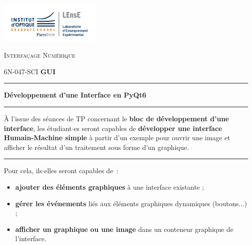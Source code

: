 \documentclass[a4paper,11pt,titlepage]{article} %
\begin{document}
\newpage
\strut %

\newpage
\pagestyle{empty}

\begin{minipage}[c]{.25\linewidth}
	\includegraphics[width=5cm]{images/Logo-LEnsE.png}
\end{minipage} \hfill
\begin{minipage}[c]{.4\linewidth}

\begin{center}
\vspace{0.3cm}
{\Large \textsc{Interfaçage Numérique}}

\medskip

6N-047-SCI \qquad \textbf{\Large GUI}

\end{center}
\end{minipage}\hfill

\vspace{0.5cm}

\noindent \rule{\linewidth}{1pt}

{\noindent\Large  \rule[-7pt]{0pt}{30pt} \textbf{Développement d'une Interface en PyQt6}}

\noindent \rule{\linewidth}{1pt}

\bigskip 


{\large À l'issue des séances de TP concernant le \textbf{bloc de développement d'une interface}, les étudiant$\cdot$es seront capables de \textbf{développer une interface Humain-Machine simple} à partir d'un exemple pour ouvrir une image et afficher le résultat d'un traitement sous forme d'un graphique.}


\noindent \rule{\linewidth}{1pt}

\medskip

Pour cela, ils$\cdot$elles seront capables de~:

\begin{itemize}
	\item \textbf{ajouter des éléments graphiques} à une interface existante ;
	\item \textbf{gérer les événements} liés aux éléments graphiques dynamiques (boutons...) ;
	\item \textbf{afficher un graphique ou une image} dans un conteneur graphique de l'interface.
\end{itemize}
\end{document}
